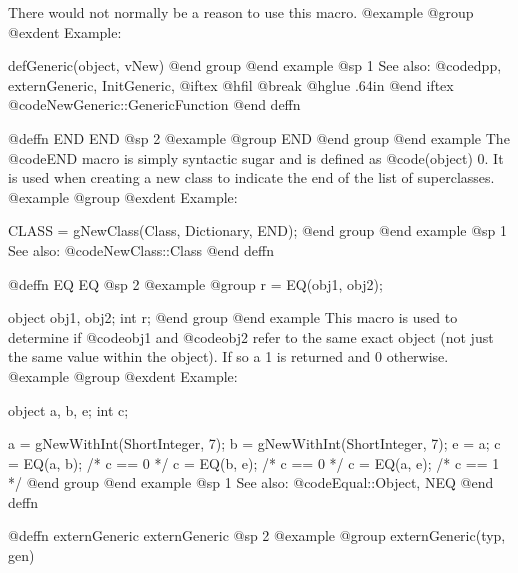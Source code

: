 {{{{There would not normally be a reason to use this macro.
@example
@group
@exdent Example:

defGeneric(object, vNew)
@end group
@end example
@sp 1
See also:  @code{dpp, externGeneric, InitGeneric,}
@iftex
@hfil @break @hglue .64in      
@end iftex
@code{NewGeneric::GenericFunction}
@end deffn



















@deffn {END} END
@sp 2
@example
@group
END
@end group
@end example
The @code{END} macro is simply syntactic sugar and is defined
as @code{(object) 0}.  It is used when creating a new class to
indicate the end of the list of superclasses.
@example
@group
@exdent Example:

CLASS = gNewClass(Class, Dictionary, END);
@end group
@end example
@sp 1
See also:  @code{NewClass::Class}
@end deffn














@deffn {EQ} EQ
@sp 2
@example
@group
r = EQ(obj1, obj2);

object  obj1, obj2;
int     r;
@end group
@end example
This macro is used to determine if @code{obj1} and @code{obj2} refer to
the same exact object (not just the same value within the object).  If
so a 1 is returned and 0 otherwise.
@example
@group
@exdent Example:

object  a, b, e;
int     c;

a = gNewWithInt(ShortInteger, 7);
b = gNewWithInt(ShortInteger, 7);
e = a;
c = EQ(a, b);   /* c == 0  */
c = EQ(b, e);   /* c == 0  */
c = EQ(a, e);   /* c == 1  */
@end group
@end example
@sp 1
See also:  @code{Equal::Object, NEQ}
@end deffn


















@deffn {externGeneric} externGeneric
@sp 2
@example
@group
externGeneric(typ, gen)

}}}}
